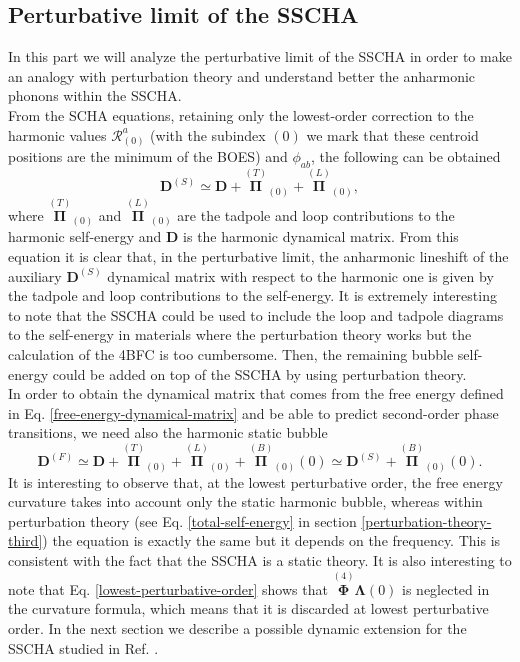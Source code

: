 \subsection{Perturbative limit of the SSCHA}
\label{pertubative-limit-sscha}

In this part we will analyze the perturbative limit of the SSCHA in order to make an analogy with perturbation theory and understand better the anharmonic phonons within the SSCHA. \\

From the SCHA equations, retaining only the lowest-order correction to the harmonic values $\mathcal{R}_{(0)}^{a}$ (with the subindex $(0)$ we mark that these centroid positions are the minimum of the BOES) and 
$\phi_{ab}$, the following can be obtained\cite{bianco2017second}
\begin{equation}
 \mathbf{D}^{(S)}\simeq\mathbf{D}+\overset{(T)}{\boldsymbol{\Pi}}_{(0)}+\overset{(L)}{\boldsymbol{\Pi}}_{(0)},
\end{equation}
where $\overset{(T)}{\boldsymbol{\Pi}}_{(0)}$ and $\overset{(L)}{\boldsymbol{\Pi}}_{(0)}$ are the tadpole and loop contributions to the harmonic self-energy and $\mathbf{D}$ is the harmonic dynamical matrix. From 
this equation it is clear that, in the perturbative limit, the anharmonic lineshift of the auxiliary $\mathbf{D}^{(S)}$ dynamical matrix with respect to the harmonic one is given by the tadpole and loop 
contributions to the self-energy. It is extremely interesting to note that the SSCHA could be used to include the loop and tadpole diagrams to the self-energy in materials where the perturbation theory works but 
the calculation of the 4BFC is too cumbersome. Then, the remaining bubble self-energy could be added on top of the SSCHA by using perturbation theory. \\

In order to obtain the dynamical matrix that comes from the free energy defined in Eq. \ref{free-energy-dynamical-matrix} and be able to predict second-order phase transitions, we need also the harmonic static bubble
\begin{equation}
 \label{lowest-perturbative-order}
 \mathbf{D}^{(F)}\simeq\mathbf{D}+\overset{(T)}{\boldsymbol{\Pi}}_{(0)}+\overset{(L)}{\boldsymbol{\Pi}}_{(0)}+\overset{(B)}{\boldsymbol{\Pi}}_{(0)}(0)\simeq\mathbf{D}^{(S)}+\overset{(B)}{\boldsymbol{\Pi}}_{(0)}(0).
\end{equation}  
It is interesting to observe that, at the lowest perturbative order, the free energy curvature takes into account only the static harmonic bubble, whereas within perturbation theory (see Eq. \ref{total-self-energy} 
in section \ref{perturbation-theory-third}) the equation is exactly the same but it depends on the frequency. This is consistent with the fact that the SSCHA is a static theory. It is also interesting to note 
that Eq. \ref{lowest-perturbative-order} shows that $\overset{(4)}{\boldsymbol{\Phi}}\boldsymbol{\Lambda}(0)$ is neglected in the curvature formula, which means that it is discarded at lowest perturbative order. 
In the next section we describe a possible dynamic extension for the SSCHA studied in Ref. \cite{bianco2017second}.
 
